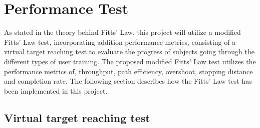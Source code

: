 \section{Performance Test} \label{sec:M:fittsLaw}



As stated in  the theory behind Fitts' Law, this project will utilize a modified Fitts' Law test, incorporating addition performance metrics, consisting of a virtual target reaching test to evaluate the progress of subjects going through the different types of user training. The proposed modified Fitts' Law test utilizes the performance metrics of, throughput, path efficiency, overshoot, stopping distance and completion rate. The following section describes how the Fitts' Law test has been implemented in this project.

\subsection{Virtual target reaching test} \label{sub:M:targetReachingTest}

